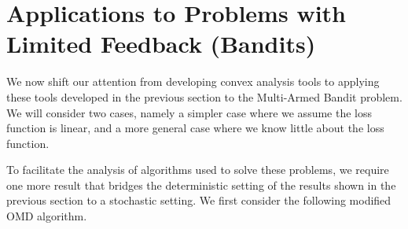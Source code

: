 \section{Applications to Problems with Limited Feedback (Bandits)}
We now shift our attention from developing convex analysis tools to applying these tools developed in the previous section to the Multi-Armed Bandit problem. We will consider two cases, namely a simpler case where we assume the loss function is linear, and a more general case where we know little about the loss function. 

To facilitate the analysis of algorithms used to solve these problems, we require one more result that bridges the deterministic setting of the results shown in the previous section to a stochastic setting. We first consider the following modified OMD algorithm.

\begin{center}
\end{center}



